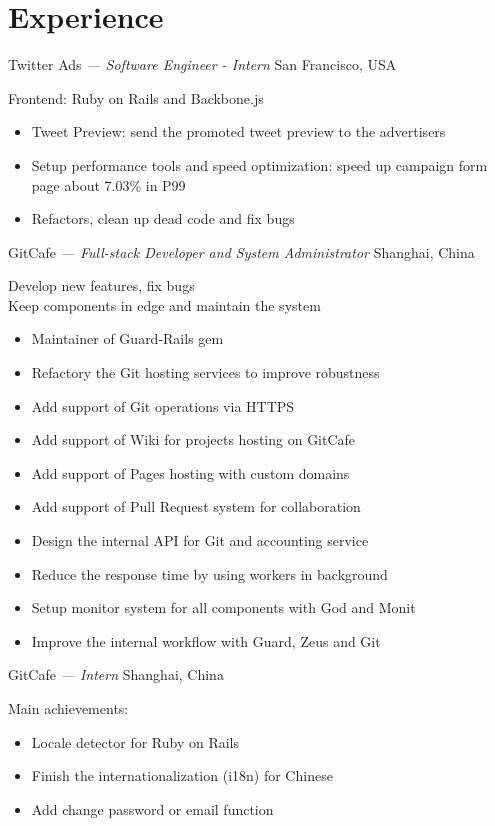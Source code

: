 \documentclass[]{friggeri-cv} %
\begin{document}

\section{Experience}

\begin{entrylist}
  {Twitter Ads \emph{--- Software Engineer - Intern}}
  {San Francisco, USA}
  {
    Frontend: Ruby on Rails and Backbone.js
    \begin{itemize}
      \item Tweet Preview: send the promoted tweet preview to the advertisers
      \item Setup performance tools and speed optimization: speed up campaign form page about 7.03\% in P99
      \item Refactors, clean up dead code and fix bugs
    \end{itemize}
  }
  {GitCafe \emph{--- Full-stack Developer and System Administrator}}
  {Shanghai, China}
  {
    Develop new features, fix bugs\\
    Keep components in edge and maintain the system
    \begin{itemize}
    \item Maintainer of Guard-Rails gem
    \item Refactory the Git hosting services to improve robustness
    \item Add support of Git operations via HTTPS
    \item Add support of Wiki for projects hosting on GitCafe
    \item Add support of Pages hosting with custom domains
    \item Add support of Pull Request system for collaboration
    \item Design the internal API for Git and accounting service
    \item Reduce the response time by using workers in background
    \item Setup monitor system for all components with God and Monit
    \item Improve the internal workflow with Guard, Zeus and Git
    \end{itemize}
  }
  {GitCafe \emph{--- Intern}}
  {Shanghai, China}
  {
    Main achievements:
    \begin{itemize}
    \item Locale detector for Ruby on Rails
    \item Finish the internationalization (i18n) for Chinese
    \item Add change password or email function
    \end{itemize}
  }
\end{entrylist}
\end{document}
